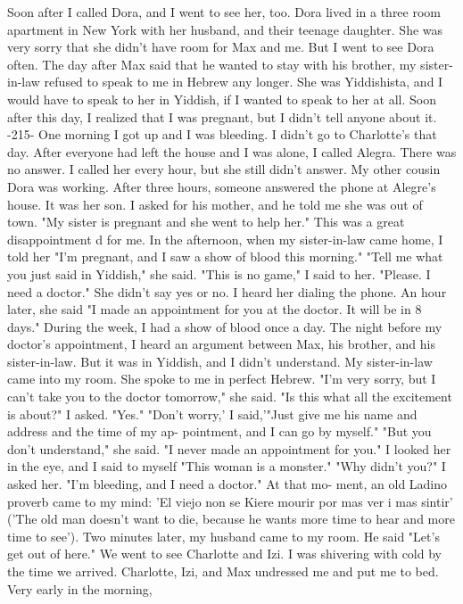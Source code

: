 Soon after I called Dora, and I went to see her, too. Dora lived in a three 
room apartment in New York with her husband, and their teenage daughter. She was 
very sorry that she didn't have room for Max and me. But I went to see Dora often. 
The day after Max said that he wanted to stay with his brother, my sister-in-law 
refused to speak to me in Hebrew any longer. She was Yiddishista, and I would have 
to speak to her in Yiddish, if I wanted to speak to her at all. Soon after this 
day, I realized that I was pregnant, but I didn't tell anyone about it. 
-215- 
One morning I got up and I was bleeding. I didn't go to Charlotte's that day. 
After everyone had left the house and I was alone, I called Alegra. There was no answer. I called her every hour, but she still didn't answer. My other cousin Dora was 
working. After three hours, someone answered the phone at Alegre's house. It was her 
son. I asked for his mother, and he told me she was out of town. "My sister is pregnant and she went to help her." This was a great disappointment d for me. In the afternoon, when my sister-in-law came home, I told her "I'm pregnant, and I saw a show of 
blood this morning." 
"Tell me what you just said in Yiddish," she said. 
"This is no game," I said to her. "Please. I need a doctor." 
She didn't say yes or no. I heard her dialing the phone. An hour later, she 
said "I made an appointment for you at the doctor. It will be in 8 days." 
During the week, I had a show of blood once a day. The night before my doctor's 
appointment, I heard an argument between Max, his brother, and his sister-in-law. But 
it was in Yiddish, and I didn't understand. My sister-in-law came into my room. She 
spoke to me in perfect Hebrew. 
"I'm very sorry, but I can't take you to the doctor tomorrow," she said. 
"Is this what all the excitement is about?" I asked. 
"Yes." 
"Don't worry,' I said,'"Just give me his name and address and the time of my ap-
pointment, and I can go by myself." 
"But you don't understand," she said. "I never made an appointment for you." 
I looked her in the eye, and I said to myself "This woman is a monster." 
"Why didn't you?" I asked her. "I'm bleeding, and I need a doctor." At that mo-
ment, an old Ladino proverb came to my mind: 'El viejo non se Kiere mourir por mas ver 
i mas sintir' ('The old man doesn't want to die, because he wants more time to hear 
and more time to see'). 
Two minutes later, my husband came to my room. He said "Let's get out of here." 
We went to see Charlotte and Izi. I was shivering with cold by the time we arrived. 
Charlotte, Izi, and Max undressed me and put me to bed. Very early in the morning, 
